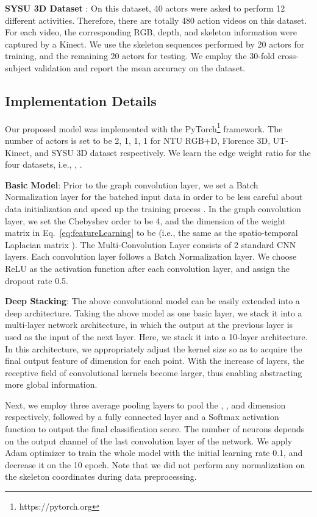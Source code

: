 \documentclass[conference]{IEEEtran}
\begin{document}
\textbf{SYSU 3D Dataset} \cite{Hu_2015_CVPR}: On this dataset, 40 actors were asked to perform 12 different activities. Therefore, there are totally 480 action videos on this dataset. For each video, the corresponding RGB, depth, and skeleton information were captured by a Kinect. We use the skeleton sequences performed by 20 actors for training, and the remaining 20 actors for testing. We employ the 30-fold cross-subject validation and report the mean accuracy on the dataset.


\subsection{Implementation Details}
\label{subsec:implement}

Our proposed model was implemented with the PyTorch\footnote{https://pytorch.org} framework. The number of actors  is set to be 2, 1, 1, 1 for NTU RGB+D, Florence 3D, UT-Kinect, and SYSU 3D dataset respectively. We learn the edge weight ratio  for the four datasets, i.e., , . 

\textbf{Basic Model}: Prior to the graph convolution layer, we set a Batch Normalization layer for the batched input data in order to be less careful about data initialization and speed up the training process \cite{Sergey_2015_ICML}. In the graph convolution layer, we set the Chebyshev order  to be 4, and the dimension of the weight matrix  in Eq.~\ref{eq:featureLearning} to be  (i.e., the same as the spatio-temporal Laplacian matrix ). The Multi-Convolution Layer consists of 2 standard CNN layers. Each convolution layer follows a Batch Normalization layer. We choose ReLU as the activation function after each convolution layer, and assign the dropout rate 0.5.

\textbf{Deep Stacking}: The above convolutional model can be easily extended into a deep architecture. Taking the above model as one basic layer, we stack it into a multi-layer network architecture, in which the output at the previous layer is used as the input of the next layer. Here, we stack it into a 10-layer architecture. In this architecture, we appropriately
adjust the kernel size so as to acquire the final output feature of dimension  for each point. With the increase of layers, the receptive field of convolutional kernels become larger, thus enabling abstracting more global information.

Next, we employ three average pooling layers to pool the , , and  dimension respectively, followed by a fully connected layer and a Softmax activation function to output the final classification score. The number of neurons depends on the output channel of the last convolution layer of the network. We apply Adam \cite{kingma2014adam} optimizer to train the whole model with the initial learning rate 0.1, and decrease it on the 10 epoch. Note that we did not perform any normalization on the skeleton coordinates during data preprocessing.
\end{document}
